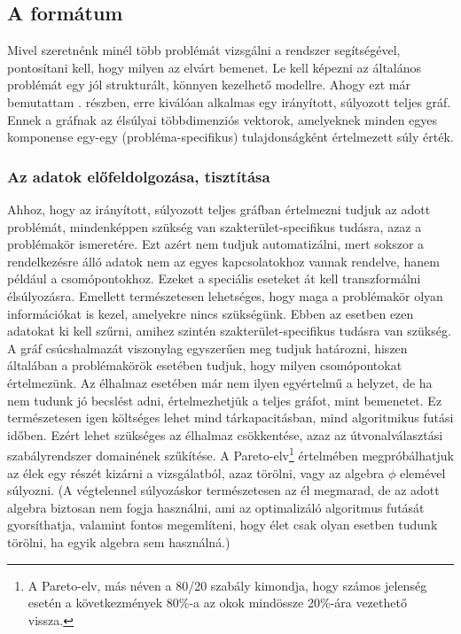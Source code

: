     \subsection{A formátum}
    Mivel szeretnénk minél több problémát vizsgálni a rendszer segítségével, pontosítani kell, hogy milyen az elvárt bemenet. Le kell képezni az általános problémát egy jól strukturált, könnyen kezelhető modellre. Ahogy ezt már bemutattam . részben, erre kiválóan alkalmas egy irányított, súlyozott teljes gráf. Ennek a gráfnak az élsúlyai többdimenziós vektorok, amelyeknek minden egyes komponense egy-egy (probléma-specifikus) tulajdonságként értelmezett súly érték.

      \subsubsection{Az adatok előfeldolgozása, tisztítása}\label{prep}
      Ahhoz, hogy az irányított, súlyozott teljes gráfban értelmezni tudjuk az adott problémát, mindenképpen szükség van szakterület-specifikus tudásra, azaz a problémakör ismeretére. Ezt azért nem tudjuk automatizálni, mert sokszor a rendelkezésre álló adatok nem az egyes kapcsolatokhoz vannak rendelve, hanem például a csomópontokhoz. Ezeket a speciális eseteket át kell transzformálni élsúlyozásra. Emellett természetesen lehetséges, hogy maga a problémakör olyan információkat is kezel, amelyekre nincs szükségünk. Ebben az esetben ezen adatokat ki kell szűrni, amihez szintén szakterület-specifikus tudásra van szükség.\\

      A gráf csúcshalmazát viszonylag egyszerűen meg tudjuk határozni, hiszen általában a problémakörök esetében tudjuk, hogy milyen csomópontokat értelmezünk. Az élhalmaz esetében már nem ilyen egyértelmű a helyzet, de ha nem tudunk jó becslést adni, értelmezhetjük a teljes gráfot, mint bemenetet. Ez természetesen igen költséges lehet mind tárkapacitásban, mind algoritmikus futási időben. Ezért lehet szükséges az élhalmaz csökkentése, azaz az útvonalválasztási szabályrendszer domainének szűkítése. A Pareto-elv\footnote{A Pareto-elv, más néven a 80/20 szabály kimondja, hogy számos jelenség esetén a következmények 80\%-a az okok mindössze 20\%-ára vezethető vissza.} értelmében megpróbálhatjuk az élek egy részét kizárni a vizsgálatból, azaz törölni, vagy az algebra $\phi$ elemével súlyozni. (A végtelennel súlyozáskor természetesen az él megmarad, de az adott algebra biztosan nem fogja használni, ami az optimalizáló algoritmus futását gyorsíthatja, valamint fontos megemlíteni, hogy élet csak olyan esetben tudunk törölni, ha egyik algebra sem használná.)\\

